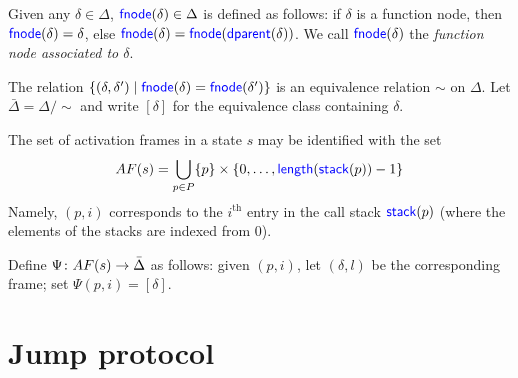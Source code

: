 \documentclass[11pt, oneside, letterpaper]{book}
\begin{document}
\begin{definition}
  Given any $\delta\in\Delta$, $\textsf{\textcolor{blue}{\textup{fnode}}}(\delta)\in\Delta$ is defined as
  follows: if $\delta$ is a function node, then
  $\textsf{\textcolor{blue}{\textup{fnode}}}(\delta)=\delta$, else
  $\textsf{\textcolor{blue}{\textup{fnode}}}(\delta)=\textsf{\textcolor{blue}{\textup{fnode}}}(\textsf{\textcolor{blue}{\textup{dparent}}}(\delta))$.  We call $\textsf{\textcolor{blue}{\textup{fnode}}}(\delta)$
  the \emph{function node associated to $\delta$}.
\end{definition}

The relation $\{(\delta,\delta')\mid \textsf{\textcolor{blue}{\textup{fnode}}}(\delta)=\textsf{\textcolor{blue}{\textup{fnode}}}(\delta')\}$
is an equivalence relation $\sim$ on $\Delta$.  Let
$\bar{\Delta}=\Delta/\sim$ and write $[\delta]$ for the equivalence
class containing $\delta$.

The set of activation frames in a state $s$ may be identified with the 
set
\[
AF(s)=\bigcup_{p\in P}\{p\}\times\{0,\ldots,\textsf{\textcolor{blue}{\textup{length}}}(\textsf{\textcolor{blue}{\textup{stack}}}(p))-1\}
\]
Namely, $(p,i)$ corresponds to the $i^{\text{th}}$ entry in the call
stack $\textsf{\textcolor{blue}{\textup{stack}}}(p)$ (where the elements of the stacks are indexed from
$0$).

Define $\Psi\colon AF(s)\rightarrow \bar{\Delta}$ as follows: given $(p,i)$,
let $(\delta,l)$ be the corresponding frame; set $\Psi(p,i)=[\delta]$.



\section{Jump protocol}
\label{sec:jump}



\end{document}
